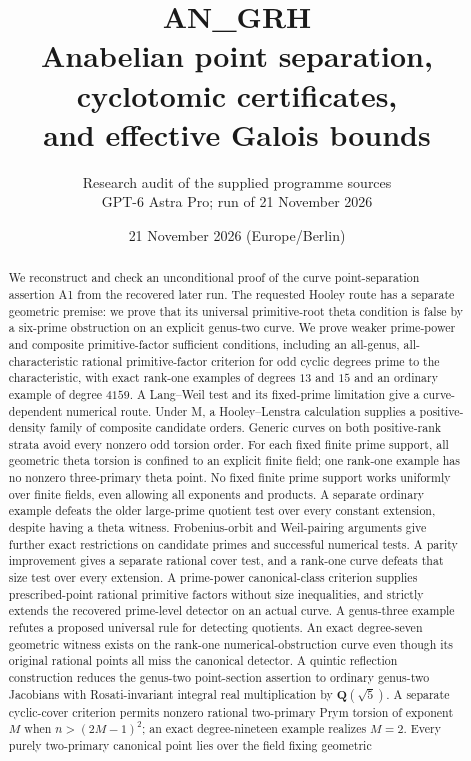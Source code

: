 \documentclass[11pt,a4paper]{article}
\title{\textbf{AN\_GRH}\\[7pt]Anabelian point separation, cyclotomic certificates,\\and effective Galois bounds}
\author{Research audit of the supplied programme sources\\GPT-6 Astra Pro; run of 21 November 2026}
\date{21 November 2026 (Europe/Berlin)}
\begin{document}
\maketitle
\begin{abstract}
We reconstruct and check an unconditional proof of the curve point-separation
assertion A1 from the recovered later run. The requested Hooley route has a
separate geometric premise: we prove that its universal primitive-root theta
condition is false by a six-prime obstruction on an explicit genus-two curve.
We prove weaker prime-power and composite primitive-factor sufficient
conditions, including an all-genus, all-characteristic rational primitive-factor criterion
for odd cyclic degrees prime to the characteristic,
with exact rank-one examples of degrees $13$ and $15$ and an
ordinary example of degree $4159$. A Lang--Weil test and its fixed-prime
limitation give a curve-dependent numerical route. Under M, a Hooley--Lenstra
calculation supplies a positive-density family of composite candidate orders.
Generic curves on both positive-rank strata avoid every nonzero odd torsion
order. For each fixed finite prime support, all geometric theta torsion is
confined to an explicit finite field; one rank-one example has no nonzero
three-primary theta point. No fixed finite prime support works uniformly over
finite fields, even allowing all exponents and products. A separate ordinary
example defeats the older large-prime quotient test over every constant
extension, despite having a theta witness. Frobenius-orbit and Weil-pairing
arguments give further exact restrictions on candidate primes and successful
numerical tests. A parity improvement gives a separate rational cover test,
and a rank-one curve defeats that size test over every extension. A
prime-power canonical-class criterion supplies prescribed-point rational
primitive factors without size inequalities, and strictly extends the
recovered prime-level detector on an actual curve. A genus-three example
refutes a proposed universal rule for detecting quotients. An exact
degree-seven geometric witness exists on the rank-one numerical-obstruction
curve even though its original rational points all miss the canonical detector.
A quintic reflection construction reduces the genus-two point-section
assertion to ordinary genus-two Jacobians with Rosati-invariant integral real
multiplication by $\mathbf Q(\sqrt5)$. A separate cyclic-cover criterion permits
nonzero rational two-primary Prym torsion of exponent $M$ when
$n>(2M-1)^2$; an exact degree-nineteen example realizes $M=2$.
Every purely two-primary canonical point lies over the field fixing geometric

\end{abstract}
\end{document}
